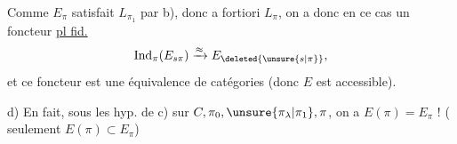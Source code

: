 Comme $E_\pi$ satisfait $L_{\pi_1}$ par b), donc a fortiori $L_\pi$, on a donc en ce cas un foncteur \uline{pl fid.}
\[\mathrm{Ind}_{\pi}(E_{s\pi})\xrightarrow{\approx}E_{\deleted{\unsure{s|\pi}}},\]
et ce foncteur est une équivalence de catégories (donc $E$ est accessible).

d) En fait, sous les hyp. de c) sur $C,\pi_0,\unsure{\pi_\lambda|\pi_1},\pi$, on a $E(\pi)=E_\pi$ ! ( seulement $E(\pi)\subset E_\pi$)


